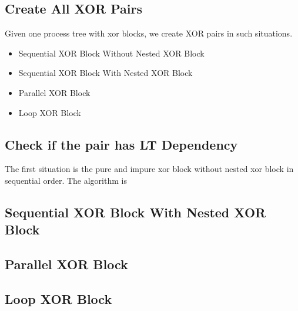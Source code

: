 \documentclass[]{article}
\begin{document}
\subsection{Create All XOR Pairs}
Given one process tree with xor blocks, we create XOR pairs in such situations. 
\begin{itemize}
	\item Sequential XOR Block Without Nested XOR Block \\
	
	\item Sequential XOR Block With Nested XOR Block \\
	
	\item Parallel XOR Block
	\item Loop XOR Block
\end{itemize}
\subsection{Check if the pair has LT Dependency}
The first situation is the pure and impure xor block without nested xor block in sequential order. The algorithm is 
\subsection{Sequential XOR Block With Nested XOR Block}

\subsection{Parallel XOR Block}

\subsection{Loop XOR Block}
\end{document}
